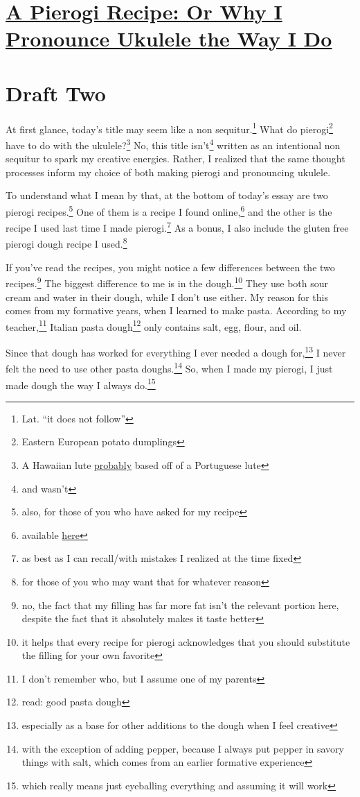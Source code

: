 \documentclass[12pt]{article}[titlepage]
\newcommand{\say}[1]{``#1''}
\newcommand{\1}{\={a}}
\newcommand{\2}{\={e}}
\newcommand{\3}{\={\i}}
\newcommand{\4}{\=o}
\newcommand{\5}{\=u}
\newcommand{\6}{\={A}}
\renewcommand{\,}{\textsuperscript{,}}
\begin{document}
\doublespacing
\section{\href{pierogi-recipe.html}{A Pierogi Recipe: Or Why I Pronounce Ukulele the Way I Do}}
\section{Draft Two}
At first glance, today's title may seem like a non sequitur.\footnote{Lat. \say{it does not follow}}
What do pierogi\footnote{Eastern European potato dumplings} have to do with the ukulele?\footnote{A Hawaiian lute \href{https://en.wikipedia.org/wiki/Ukulele}{probably} based off of a Portuguese lute}
No, this title isn't\footnote{and wasn't} written as an intentional non sequitur to spark my creative energies.
Rather, I realized that the same thought processes inform my choice of both making pierogi and pronouncing ukulele.

To understand what I mean by that, at the bottom of today's essay are two pierogi recipes.\footnote{also, for those of you who have asked for my recipe}
One of them is a recipe I found online,\footnote{available \href{https://thestayathomechef.com/pierogi/}{here}} and the other is the recipe I used last time I made pierogi.\footnote{as best as I can recall/with mistakes I realized at the time fixed}
As a bonus, I also include the gluten free pierogi dough recipe I used.\footnote{for those of you who may want that for whatever reason}

If you've read the recipes, you might notice a few differences between the two recipes.\footnote{no, the fact that my filling has far more fat isn't the relevant portion here, despite the fact that it absolutely makes it taste better}
The biggest difference to me is in the dough.\footnote{it helps that every recipe for pierogi acknowledges that you should substitute the filling for your own favorite}
They use both sour cream and water in their dough, while I don't use either.
My reason for this comes from my formative years, when I learned to make pasta.
According to my teacher,\footnote{I don't remember who, but I assume one of my parents} Italian pasta dough\footnote{read: good pasta dough} only contains salt, egg, flour, and oil.

Since that dough has worked for everything I ever needed a dough for,\footnote{especially as a base for other additions to the dough when I feel creative} I never felt the need to use other pasta doughs.\footnote{with the exception of adding pepper, because I always put pepper in savory things with salt, which comes from an earlier formative experience}
So, when I made my pierogi, I just made dough the way I always do.\footnote{which really means just eyeballing everything and assuming it will work}
\end{document}
